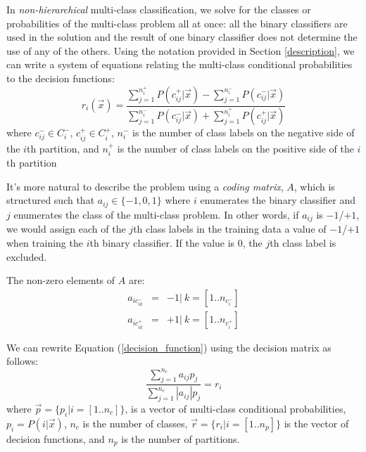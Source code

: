 \documentclass{article}
\begin{document}
In {\it non-hierarchical} multi-class classification, we solve for the
classes or probabilities of the multi-class problem all at once:
all the binary classifiers are used in the solution and the result of
one binary classifier does not determine the use of any of the others.
Using the notation provided in Section \ref{description}, 
we can write a system of equations relating
the multi-class conditional probabilities to the decision
functions:
\begin{equation}
	r_i(\vec x) = \frac{\sum_{j=1}^{n_i^+} P(c_{ij}^+|\vec x) - \sum_{j=1}^{n_{i}^-} P(c_{ij}^-|\vec x)}{\sum_{j=1}^{n_i^-} P(c_{ij}^-|\vec x) + \sum_{j=1}^{n_i^+} P(c_{ij}^+|\vec x)}
	\label{decision_function}
\end{equation}
where 
$c_{ij}^- \in C_i^-$,
$c_{ij}^+ \in C_i^+$,
$n_i^-$ is the number of class labels on the negative side of
the $i$th partition,
and $n_i^+$ is the number of class labels on the positive side of
the $i$th partition

It's more natural to describe the problem using a
{\it coding matrix}, $A$, 
which is structured such that
$a_{ij} \in \lbrace -1, 0, 1 \rbrace$ where $i$ enumerates the binary classifier and
$j$ enumerates the class of the multi-class problem.
In other words, if $a_{ij}$ is $-1$/$+1$, we would assign each of the $j$th class
labels in the training data a value of $-1$/$+1$ when training the $i$th
binary classifier. If the value is $0$, the $j$th class label is excluded.
\citep{Dietterich_Bakiri1995,Windeatt_Ghaderi2002}

The non-zero elements of $A$ are:
\begin{eqnarray}
	a_{ic_{ik}^-} & = & -1 | ~k = [1..n_{c_i^-}]\\
a_{ic_{ik}^+} & = & +1 | ~k=[1..n_{c_i^+}]
\end{eqnarray}

We can rewrite Equation (\ref{decision_function}) using the decision
matrix as follows:
\begin{equation}
	\frac{\sum_{j=1}^{n_c} a_{ij} p_j}{\sum_{j=1}^{n_c} |a_{ij}| p_j} = r_i
	\label{non_hier}
\end{equation}
where $\vec p=\lbrace p_i | i=[1..n_c]\rbrace$, 
is a vector of multi-class conditional probabilities, $p_i=P(i|\vec x)$, 
$n_c$ is the number of classes,
$\vec r=\lbrace r_i| i=[1..n_p]\rbrace$ 
is the vector of decision functions,
and
$n_p$ is the number of partitions.
\end{document}
